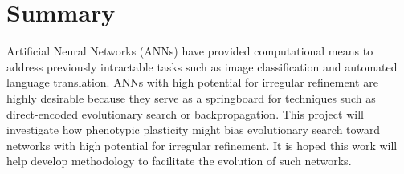 \section{Summary}
Artificial Neural Networks (ANNs) have provided computational means to address previously intractable tasks such as image classification and automated language translation.
ANNs with high potential for irregular refinement are highly desirable because they serve as a springboard for techniques such as direct-encoded evolutionary search or backpropagation.
This project will investigate how phenotypic plasticity might bias evolutionary search toward networks with high potential for irregular refinement.
It is hoped this work will help develop methodology to facilitate the evolution of such networks.
